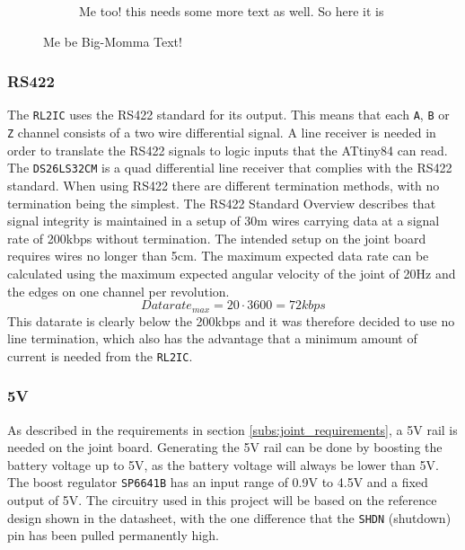 \begin{figure}[H]
\begin{minipage}{.4\linewidth}
\begin{subfigure}[b]{\linewidth}
			\caption{Me too! this needs some more text as well. So here it is}
			\label{sfig:readside_2}
		\end{subfigure}
	\end{minipage}
	\caption{Me be Big-Momma Text!}
	\label{fig:mechdesign}
\end{figure}

\subsubsection{RS422}
The \texttt{RL2IC} uses the RS422 standard for its output.
This means that each \texttt{A}, \texttt{B} or \texttt{Z} channel consists of a two wire differential signal.
A line receiver is needed in order to translate the RS422 signals to logic inputs that the ATtiny84 can read.
The \texttt{DS26LS32CM} is a quad differential line receiver that complies with the RS422 standard.  
When using RS422 there are different termination methods, with no termination being the simplest.
The RS422 Standard Overview \cite{rs422_texas} describes that signal integrity is maintained in a setup of \approx 30m wires carrying data at a signal rate of 200kbps without termination.
The intended setup on the joint board requires wires no longer than 5cm.
The maximum expected data rate can be calculated using the maximum expected angular velocity of the joint of 20Hz and the edges on one channel per revolution.
\begin{equation}
Datarate_{max}	= 20 \cdot 3600 = 72kbps
\end{equation}
This datarate is clearly below the 200kbps and it was therefore decided to use no line termination, which also has the advantage that a minimum amount of current is needed from the \texttt{RL2IC}.


\subsubsection{5V}
As described in the requirements in section \ref{subs:joint_requirements}, a 5V rail is needed on the joint board.
Generating the 5V rail can be done by boosting the battery voltage up to 5V, as the battery voltage will always be lower than 5V.
The boost regulator \texttt{SP6641B} \cite{sp6641b} has an input range of 0.9V to 4.5V and a fixed output of 5V.
The circuitry used in this project will be based on the reference design shown in the datasheet, with the one difference that the \texttt{SHDN} (shutdown) pin has been pulled permanently high.

